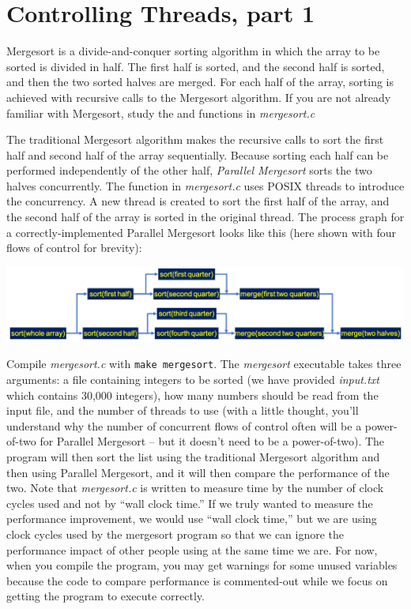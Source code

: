 \section{Controlling Threads, part 1}

Mergesort is a divide-and-conquer sorting algorithm in which the array to be
sorted is divided in half. The first half is sorted, and the second half is
sorted, and then the two sorted halves are merged. For each half of the array,
sorting is achieved with recursive calls to the Mergesort algorithm. If you are
not already familiar with Mergesort, study the 
and  functions in \textit{mergesort.c}

The traditional Mergesort algorithm makes the recursive calls to sort the first
half and second half of the array sequentially. Because sorting each half can
be performed independently of the other half, \textit{Parallel Mergesort} sorts
the two halves concurrently. The  function in
\textit{mergesort.c} uses POSIX threads to introduce the concurrency. A new
thread is created to sort the first half of the array, and the second half of
the array is sorted in the original thread. The process graph for a
correctly-implemented Parallel Mergesort looks like this (here shown with four
flows of control for brevity):

\includegraphics[scale=0.5]{mergesort-graph}

Compile \textit{mergesort.c} with \texttt{make mergesort}. The
\textit{mergesort} executable takes three arguments: a file containing integers
to be sorted (we have provided \textit{input.txt} which contains 30,000
integers), how many numbers should be read from the input file, and the number
of threads to use (with a little thought, you'll understand why the number of
concurrent flows of control often will be a power-of-two for Parallel Mergesort
-- but it doesn't need to be a power-of-two). The program will then sort the
list using the traditional Mergesort algorithm and then using Parallel
Mergesort, and it will then compare the performance of the two. Note that
\textit{mergesort.c} is written to measure time by the number of clock cycles
used and not by ``wall clock time.'' If we truly wanted to measure the
performance improvement, we would use ``wall clock time,'' but we are using
clock cycles used by the mergesort program so that we can ignore the
performance impact of other people using \runtimeenvironment at the same time
we are. For now, when you compile the program, you may get warnings for some
unused variables because the code to compare performance is commented-out while
we focus on getting the program to execute correctly.

